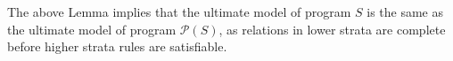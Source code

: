 The above Lemma implies that the ultimate model of \plang program $S$ is the same as the ultimate model of \lang program $\mathcal{P}(S)$, as relations in lower strata are complete before higher strata rules are satisfiable.





%
%


